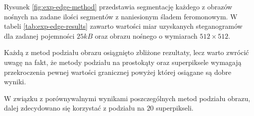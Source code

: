 {{{            Rysunek \ref{fig:exp-edge-method} przedstawia segmentację każdego z obrazów nośnych na zadane ilości
            segmentów z naniesionym śladem feromonowym. W tabeli \ref{tab:exp-edge-results} zawarto wartości miar
            uzyskanych steganogramów dla zadanej pojemności $25kB$ oraz obrazu nośnego o wymiarach $512 \times 512$.

            Każdą z metod podziału obrazu osiągnięto zbliżone rezultaty, lecz warto zwrócić uwagę na fakt, że metody
            podziału na prostokąty oraz superpiksele wymagają przekroczenia pewnej wartości granicznej powyżej której
            osiągane są dobre wyniki.

            W związku z porównywalnymi wynikami poszczególnych metod podziału obrazu, dalej zdecydowano się korzystać z
            podziału na $20$ superpikseli.

}}}
